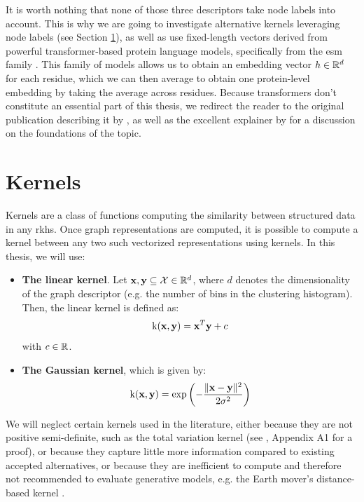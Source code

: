 It is worth nothing that none of those three descriptors take node labels into
account. This is why we are going to investigate alternative kernels leveraging
node labels (see Section \ref{sec:kernels}), as well as use fixed-length vectors
derived from powerful transformer-based protein language models, specifically
from the \acrfull{esm} family \citep{rives2021biological}. This family of models
allows us to obtain an embedding vector $h\in\mathbb{R}^d$ for each residue, which we
can then average to obtain one protein-level embedding by taking the average
across residues. Because transformers don't constitute an essential part of this
thesis, we redirect the reader to the original publication describing it by
\cite{vaswani2017attention}, as well as the excellent explainer by
\cite{alammar2018} for a discussion on the foundations of the topic.

\section{Kernels}\label{sec:kernels}

Kernels are a class of functions computing the similarity between structured
data in any \acrfull{rkhs}. Once graph representations are computed, it is
possible to compute a kernel between any two such vectorized representations
using kernels. In this thesis, we will use:

\begin{itemize}
\item \textbf{The linear kernel}. Let $\mathbf{x},\mathbf{y}\subseteq \mathcal{X}\in\mathbb{R}^d$, where $d$
  denotes the dimensionality of the graph descriptor (e.g. the number of bins in
  the clustering histogram). Then, the linear kernel is defined as:
  \begin{equation}
    \label{eq:linear_kernel}
    \text{k}(\mathbf{x}, \mathbf{y}) = \mathbf{x}^T \mathbf{y} + c
  \end{equation}
  with $c\in\mathbb{R}$.
\item \textbf{The Gaussian kernel}, which is given by:
  \begin{equation}
    \label{eq:gaussian_kernel}
    \text{k}(\mathbf{x}, \mathbf{y}) = \exp\left( -{\lVert \mathbf{x}-\mathbf{y} \rVert^2\over 2\sigma^2} \right)
  \end{equation}
\end{itemize}

We will neglect certain kernels used in the literature, either because they are
not positive semi-definite, such as the total variation kernel (see
\cite{obray2022evaluation}, Appendix A1 for a proof), or because they capture
little more information compared to existing accepted alternatives, or because
they are inefficient to compute and therefore not recommended to evaluate
generative models, e.g. the Earth mover's distance-based kernel
\citep{obray2022evaluation}.

